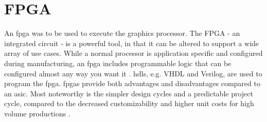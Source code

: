 \section{FPGA}
An \gls{fpga} was to be used to execute the graphics processor.
The FPGA - an integrated circuit - is a powerful tool, in that it can be altered to support a wide array of use cases.
While a normal processor is application specific and configured during manufacturing, an \gls{fpga} includes programmable logic that can be configured almost any way you want it \cite{fpga}.
\gls{hdl}s, e.g. VHDL and Verilog, are used to program the \gls{fpga}.
\gls{fpga}s provide both advantages and disadvantages compared to an \gls{asic}.
Most noteworthy is the simpler design cycles and a predictable project cycle, compared to the decreased customizability and higher unit costs for high volume productions \cite{fpgavsasic}.
